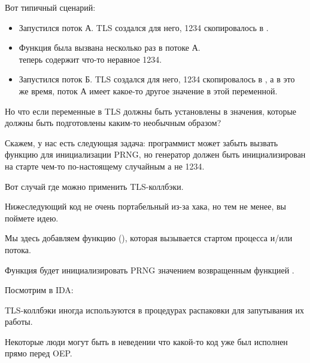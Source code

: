 Вот типичный сценарий:

\begin{itemize}
\item Запустился поток А. \ac{TLS} создался для него, 1234 скопировалось в .

\item Функция  была вызвана несколько раз в потоке А. \\
 теперь содержит что-то неравное 1234.

\item Запустился поток Б. \ac{TLS} создался для него, 1234 скопировалось в , 
а в это же время, поток А имеет какое-то другое значение в этой переменной.
\end{itemize}


Но что если переменные в \ac{TLS} должны быть установлены в значения, которые должны быть подготовлены
каким-то необычным образом?

Скажем, у нас есть следующая задача:
программист может забыть вызвать функцию  для инициализации \ac{PRNG}, но генератор должен быть
инициализирован на старте чем-то по-настоящему случайным а не 1234.

Вот случай где можно применить \ac{TLS}-коллбэки.

Нижеследующий код не очень портабельный из-за хака, но тем не менее, вы поймете идею.

Мы здесь добавляем функцию (), которая вызывается  стартом процесса и/или потока.

Функция будет инициализировать \ac{PRNG} значением возвращенным функцией .



Посмотрим в IDA:



TLS-коллбэки иногда используются в процедурах распаковки для запутывания их работы.

Некоторые люди могут быть в неведении что какой-то код уже был исполнен прямо перед \ac{OEP}.

